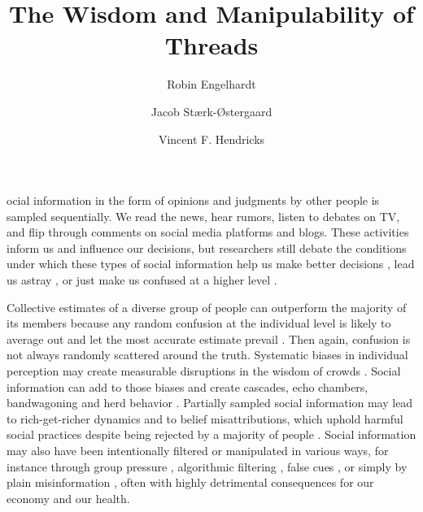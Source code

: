\documentclass[9pt,twocolumn,twoside,lineno]{pnas-new}
\title{The Wisdom and Manipulability of Threads}
\author[a,1]{Robin Engelhardt}
\author[a]{Jacob Stærk-Østergaard}
\author[a]{Vincent F. Hendricks}
\affil[a]{Center for Information and Bubble Studies, Department of Communication, University of Copenhagen, Karen Blixens Plads 8, DK-2300 Copenhagen S.}
\begin{document}
\maketitle
\thispagestyle{firststyle}

ocial information in the form of opinions and judgments by other people is sampled sequentially. We read the news, hear rumors, listen to debates on TV, and flip through comments on social media platforms and blogs. These activities inform us and influence our decisions, but researchers still debate the conditions under which these types of social information help us make better decisions \cite{woolley2010evidence, gurccay2015power, becker2017network, jayles2017social}, lead us astray \cite{caplan2011myth, lorenz2011social, minson2012cost, king2011true, le2018endogenous}, or just make us confused at a higher level \cite{salganik2006experimental, salganik2009web}.

Collective estimates of a diverse group of people can outperform the majority of its members because any random confusion at the individual level is likely to average out and let the most accurate estimate prevail \cite{galton1907vox, muth1961rational, surowiecki2005wisdom, hong2008some}. Then again, confusion is not always randomly scattered around the truth. Systematic biases in individual perception may create measurable disruptions in the wisdom of crowds \cite{izard2008calibrating, nash2014curious, kao2018counteracting}. Social information can add to those biases and create cascades, echo chambers, bandwagoning and herd behavior \cite{anderson1997information, bikhchandani1992theory, bakshy2015exposure, banerjee1992simple}. Partially sampled social information may lead to rich-get-richer dynamics \cite{barabasi1999emergence} and to belief misattributions, which uphold harmful social practices despite being rejected by a majority of people \cite{katz1931students, darley1968bystander, ross1977false, noelle1974spiral, lee2019homophily}. Social information may also have been intentionally filtered or manipulated in various ways, for instance through group pressure \cite{asch1951effects}, algorithmic filtering \cite{pariser2011filter}, false cues \cite{salganik2006experimental, muchnik2013social, hanson1996hits}, or simply by plain misinformation \cite{hendricks2018reality}, often with highly detrimental consequences for our economy and our health.
\end{document}

